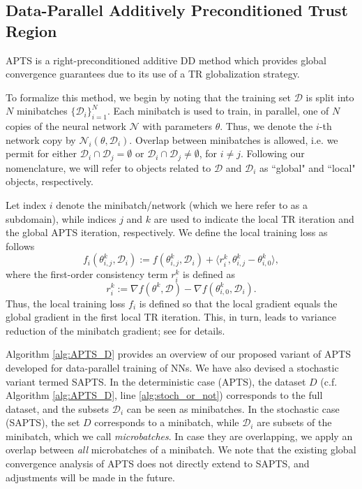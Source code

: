 \documentclass{article}
\begin{document}
\subsection{Data-Parallel Additively Preconditioned Trust Region}
\label{subsec:apts_d}
APTS \cite{grossKrause2009} is a right-preconditioned additive DD method which provides global convergence guarantees due to its use of a TR globalization strategy. 

To formalize this method, we begin by noting that the training set $\mathcal{D}$ is split into $N$ minibatches $\{\mathcal{D}_i\}_{i=1}^N$. Each minibatch is used to train, in parallel, one of $N$ copies of the neural network $\mathcal{N}$ with parameters $\theta$. Thus, we denote the $i$-th network copy by $\mathcal{N}_i(\theta, \mathcal{D}_i)$. 
Overlap between minibatches is allowed, i.e. we permit for either $\mathcal{D}_i \cap \mathcal{D}_j = \emptyset$ or $\mathcal{D}_i \cap \mathcal{D}_j \neq \emptyset$, for $i \neq j$.
Following our nomenclature, we will refer to objects related to $\mathcal{D}$ and $\mathcal{D}_i$ as ``global" and ``local" objects, respectively. 

Let index $i$ denote the minibatch/network (which we here refer to as a subdomain), while indices $j$ and $k$ are used to indicate the local TR iteration and the global APTS iteration, respectively.
We define the local training loss as follows
\begin{equation}
    \label{eq:local_training_loss}
    f_i(\theta^k_{i,j}, \mathcal{D}_i) := f(\theta^k_{i,j}, \mathcal{D}_i) + \langle r^k_i , \theta^k_{i,j} - \theta^k_{i,0}\rangle,
\end{equation}
where the first-order consistency term $r_i^k$ is defined as 
%
\begin{equation}
 {r_i^k := \nabla f (\theta^k, \mathcal{D}) - \nabla f(\theta^k_{i,0}, \mathcal{D}_i)}.   
\end{equation}
%
Thus, the local training loss $f_i$ is defined so that the local gradient equals the global gradient in the first local TR iteration. 
This, in turn, leads to variance reduction of the minibatch gradient; see \cite{braglia2020Multilevel} for details. 

Algorithm \ref{alg:APTS_D} provides an overview of our proposed variant of APTS developed for data-parallel training of NNs. 
We have also devised a stochastic variant termed SAPTS. 
In the deterministic case (APTS), the dataset $D$ (c.f. Algorithm \ref{alg:APTS_D}, line \ref{alg:stoch_or_not}) corresponds to the full dataset, and the subsets $\mathcal{D}_i$ can be seen as minibatches. 
In the stochastic case (SAPTS), the set $D$ corresponds to a minibatch, while $\mathcal{D}_i$ are subsets of the minibatch, which we call \textit{microbatches}. 
In case they are overlapping, we apply an overlap between \textit{all} microbatches of a minibatch. 
We note that the existing global convergence analysis of APTS does not directly extend to SAPTS, and adjustments will be made in the future. 
\end{document}

